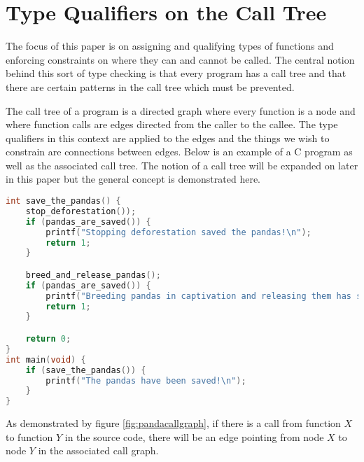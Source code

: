 \section{Type Qualifiers on the Call Tree}

The focus of this paper is on assigning and qualifying types of functions and enforcing constraints on where they can and cannot be called.  The central notion behind this sort of type checking is that every program has a call tree and that there are certain patterns in the call tree which must be prevented.  

The call tree of a program is a directed graph where every function is a node and where function calls are edges directed from the caller to the callee.  The type qualifiers in this context are applied to the edges and the things we wish to constrain are connections between edges.  Below is an example of a C program as well as the associated call tree.  The notion of a call tree will be expanded on later in this paper but the general concept is demonstrated here.  

\begin{minipage}[c]{0.95\textwidth}
\begin{lstlisting}[language=C]
int save_the_pandas() {
	stop_deforestation());
	if (pandas_are_saved()) {
		printf("Stopping deforestation saved the pandas!\n");
		return 1;
	}

	breed_and_release_pandas();
	if (pandas_are_saved()) {
		printf("Breeding pandas in captivation and releasing them has saved the pandas!\n");
		return 1;
	}

	return 0;
}
int main(void) {
	if (save_the_pandas()) {
		printf("The pandas have been saved!\n");
	}
}
\end{lstlisting}
\end{minipage}



As demonstrated by figure \ref{fig:pandacallgraph}, if there is a call from function $X$ to function $Y$ in the source code, there will be an edge pointing from node $X$ to node $Y$ in the associated call graph. 
